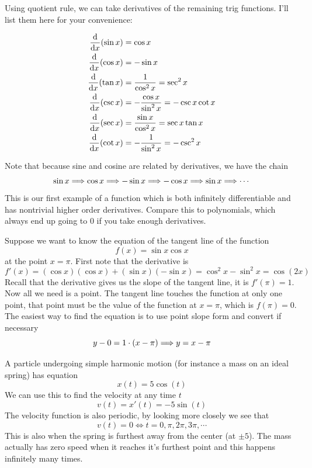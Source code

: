 Using quotient rule, we can take derivatives of the remaining trig functions. I'll list them here for your convenience:
\begin{proposition}
	\begin{align*}
		\dv{x} (\sin x) &= \cos x \\
		\dv{x} (\cos x) &= -\sin x \\
		\dv{x} (\tan x) &= \frac{1}{\cos^2 x} = \sec^2 x \\
		\dv{x} (\csc x) &= - \frac{\cos x}{\sin^2 x} = -\csc x \cot x \\
		\dv{x} (\sec x) &= \frac{\sin x}{\cos^2 x} = \sec x \tan x \\
		\dv{x} (\cot x) &= -\frac{1}{\sin^2 x} = -\csc^2 x \\
	\end{align*}
\end{proposition}

Note that because sine and cosine are related by derivatives, we have the chain
\[ \sin x \Longrightarrow \cos x \Longrightarrow -\sin x \Longrightarrow -\cos x \Longrightarrow \sin x \Longrightarrow \cdots \]
This is our first example of a function which is both infinitely differentiable and has nontrivial higher order derivatives. Compare this to polynomials, which always end up going to 0 if you take enough derivatives.

\begin{example}
	Suppose we want to know the equation of the tangent line of the function
	\[ f(x) = \sin x \cos x \]
	at the point $x = \pi$. First note that the derivative is
	\[ f'(x) = (\cos x)(\cos x) + (\sin x)(-\sin x) = \cos^2 x - \sin^2 x = \cos(2x) \]
	Recall that the derivative gives us the slope of the tangent line, it is $f'(\pi) = 1$. Now all we need is a point. The tangent line touches the function at only one point, that point must be the value of the function at $x = \pi$, which is $f(\pi) = 0$. The easiest way to find the equation is to use point slope form and convert if necessary
	\[ y - 0 = 1 \cdot (x - \pi) \Longrightarrow y = x - \pi \]
\end{example}

\begin{example}
	A particle undergoing simple harmonic motion (for instance a mass on an ideal spring) has equation
	\[ x(t) = 5 \cos(t) \]
	We can use this to find the velocity at any time $t$
	\[ v(t) = x'(t) = -5 \sin(t) \]
	The velocity function is also periodic, by looking more closely we see that 
	\[ v(t) = 0 \iff t = 0, \pi, 2\pi, 3\pi, \cdots \]
	This is also when the spring is furthest away from the center (at $\pm 5$). The mass actually has zero speed when it reaches it's furthest point and this happens infinitely many times.
\end{example}

